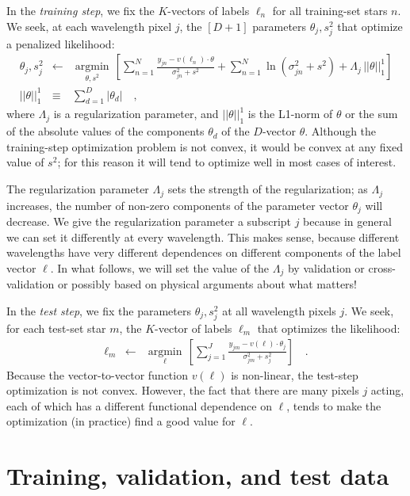 \documentclass[12pt,preprint]{aastex}
\newcommand{\argmin}[1]{\underset{#1}{\operatorname{argmin}}\,}
\begin{document}
In the \emph{training step}, we fix the $K$-vectors of labels $\ell_n$
for all training-set stars $n$.
We seek, at each wavelength pixel $j$, the $[D+1]$ parameters
$\theta_j,s^2_j$ that optimize a penalized likelihood:
\begin{eqnarray}
  \theta_j,s^2_j &\leftarrow& \argmin{\theta,s^2}\left[
    \sum_{n=1}^N \frac{y_{jn}-v(\ell_n)\cdot\theta}{\sigma^2_{jn}+s^2}
    + \sum_{n=1}^N \ln(\sigma^2_{jn}+s^2)
    + \Lambda_j\,||\theta||_1^1
    \right]
  \\
  ||\theta||_1^1 &\equiv& \sum_{d=1}^D |\theta_d|
  \quad ,
\end{eqnarray}
where $\Lambda_j$ is a regularization parameter, and $||\theta||_1^1$ is
the L1-norm of $\theta$ or the sum of the absolute values of the
components $\theta_d$ of the $D$-vector $\theta$.
Although the training-step optimization problem is not convex, it
would be convex at any fixed value of $s^2$; for this reason it will
tend to optimize well in most cases of interest.

The regularization parameter $\Lambda_j$ sets the strength of the
regularization; as $\Lambda_j$ increases, the number of non-zero
components of the parameter vector $\theta_j$ will decrease.
We give the regularization parameter a subscript $j$ because in
general we can set it differently at every wavelength.
This makes sense, because different wavelengths have very different
dependences on different components of the label vector $\ell$.
In what follows, we will set the value of the $\Lambda_j$ by
validation or cross-validation or possibly based on physical arguments
about what matters!

In the \emph{test step}, we fix the parameters $\theta_j,s^2_j$ at all
wavelength pixels $j$.
We seek, for each test-set star $m$, the $K$-vector of labels $\ell_m$
that optimizes the likelihood:
\begin{eqnarray}
  \ell_m &\leftarrow& \argmin{\ell}\left[
    \sum_{j=1}^J \frac{y_{jm}-v(\ell)\cdot\theta_j}{\sigma^2_{jm}+s^2_j}
    \right]
  \quad .
\end{eqnarray}
Because the vector-to-vector function $v(\ell)$ is non-linear, the
test-step optimization is not convex.
However, the fact that there are many pixels $j$ acting, each of which
has a different functional dependence on $\ell$, tends to make the
optimization (in practice) find a good value for $\ell$.

\section{Training, validation, and test data}
\end{document}
